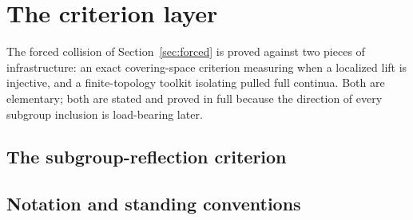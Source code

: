 \documentclass[11pt,reqno]{amsart}
\theoremstyle{definition}
\theoremstyle{remark}
\begin{document}
\section{The criterion layer}
\label{sec:criteria}

The forced collision of Section~\ref{sec:forced} is proved against two
pieces of infrastructure: an exact covering-space criterion measuring
when a localized lift is injective, and a finite-topology toolkit
isolating pulled full continua.  Both are elementary; both are stated
and proved in full because the direction of every subgroup inclusion is
load-bearing later.

\subsection{The subgroup-reflection criterion}
\subsection*{Notation and standing conventions}
\end{document}
